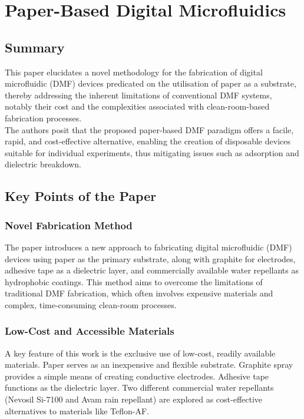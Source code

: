\chapter{Paper-Based Digital Microfluidics}
\section{Summary}
This paper elucidates a novel methodology for the fabrication of digital microfluidic (DMF) devices predicated on the utilisation of paper as a substrate, thereby addressing the inherent limitations of conventional DMF systems, notably their cost and the complexities associated with clean-room-based fabrication processes.\\

The authors posit that the proposed paper-based DMF paradigm offers a facile, rapid, and cost-effective alternative, enabling the creation of disposable devices suitable for individual experiments, thus mitigating issues such as adsorption and dielectric breakdown.

\section{Key Points of the Paper}

\subsection{Novel Fabrication Method} 
The paper introduces a new approach to fabricating digital microfluidic (DMF) devices using paper as the primary substrate, along with graphite for electrodes, adhesive tape as a dielectric layer, and commercially available water repellants as hydrophobic coatings. This method aims to overcome the limitations of traditional DMF fabrication, which often involves expensive materials and complex, time-consuming clean-room processes.

\subsection{Low-Cost and Accessible Materials} 
A key feature of this work is the exclusive use of low-cost, readily available materials. Paper serves as an inexpensive and flexible substrate. Graphite spray provides a simple means of creating conductive electrodes. Adhesive tape functions as the dielectric layer. Two different commercial water repellants (Nevosil Si-7100 and Avam rain repellant) are explored as cost-effective alternatives to materials like Teflon-AF.

